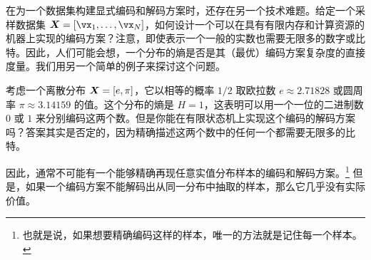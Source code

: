 \documentclass[../../book-main_zh.tex]{subfiles}
\begin{document}




在为一个数据集构建显式编码和解码方案时，还存在另一个技术难题。给定一个采样数据集 $\X = [\vx_1, \ldots, \vx_N]$，如何设计一个可以在具有有限内存和计算资源的机器上实现的编码方案？注意，即使表示一个一般的实数也需要无限多的数字或比特。因此，人们可能会想，一个分布的熵是否是其（最优）编码方案复杂度的直接度量。我们用另一个简单的例子来探讨这个问题。
\begin{example}[精度] \label{eg:two-inrational}
	考虑一个离散分布 $\bm{X} = [e, \pi]$，它以相等的概率 $1/2$ 取欧拉数 $e \approx 2.71828$ 或圆周率 $\pi \approx 3.14159$ 的值。这个分布的熵是 $H =1$，这表明可以用一个一位的二进制数 $0$ 或 $1$ 来分别编码这两个数。但是你能在有限状态机上实现这个编码的解码方案吗？答案其实是否定的，因为精确描述这两个数中的任何一个都需要无限多的比特。
\end{example}

因此，通常不可能有一个能够精确再现任意实值分布样本的编码和解码方案。\footnote{也就是说，如果想要精确编码这样的样本，唯一的方法就是记住每一个样本。} 但是，如果一个编码方案不能解码出从同一分布中抽取的样本，那么它几乎没有实际价值。
\end{document}
